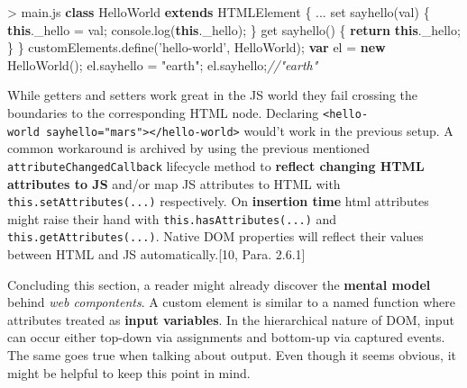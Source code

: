 \documentclass[]{assets/latex/ieee}
\newenvironment{Shaded}{}{}
\newcommand{\KeywordTok}[1]{\textcolor[rgb]{0.00,0.44,0.13}{\textbf{{#1}}}}
\newcommand{\StringTok}[1]{\textcolor[rgb]{0.25,0.44,0.63}{{#1}}}
\newcommand{\CommentTok}[1]{\textcolor[rgb]{0.38,0.63,0.69}{\textit{{#1}}}}
\newcommand{\VariableTok}[1]{\textcolor[rgb]{0.10,0.09,0.49}{{#1}}}
\newcommand{\ControlFlowTok}[1]{\textcolor[rgb]{0.00,0.44,0.13}{\textbf{{#1}}}}
\newcommand{\OperatorTok}[1]{\textcolor[rgb]{0.40,0.40,0.40}{{#1}}}
\newcommand{\AttributeTok}[1]{\textcolor[rgb]{0.49,0.56,0.16}{{#1}}}
\newcommand{\NormalTok}[1]{{#1}}
\begin{document}
\begin{Shaded}
\begin{Highlighting}[]
\OperatorTok{>} \VariableTok{main}\NormalTok{.}\AttributeTok{js}
\KeywordTok{class} \NormalTok{HelloWorld }\KeywordTok{extends} \NormalTok{HTMLElement }\OperatorTok{\{}
  \NormalTok{...}
  \NormalTok{set }\AttributeTok{sayhello}\NormalTok{(val) }\OperatorTok{\{}
    \KeywordTok{this}\NormalTok{.}\AttributeTok{_hello} \OperatorTok{=} \NormalTok{val}\OperatorTok{;}
    \VariableTok{console}\NormalTok{.}\AttributeTok{log}\NormalTok{(}\KeywordTok{this}\NormalTok{.}\AttributeTok{_hello}\NormalTok{)}\OperatorTok{;}
  \OperatorTok{\}}
  \NormalTok{get }\AttributeTok{sayhello}\NormalTok{() }\OperatorTok{\{}
    \ControlFlowTok{return} \KeywordTok{this}\NormalTok{.}\AttributeTok{_hello}\OperatorTok{;}
  \OperatorTok{\}}
\OperatorTok{\}}
\VariableTok{customElements}\NormalTok{.}\AttributeTok{define}\NormalTok{(}\StringTok{'hello-world'}\OperatorTok{,} \NormalTok{HelloWorld)}\OperatorTok{;}
\KeywordTok{var} \NormalTok{el }\OperatorTok{=} \KeywordTok{new} \AttributeTok{HelloWorld}\NormalTok{()}\OperatorTok{;}
\VariableTok{el}\NormalTok{.}\AttributeTok{sayhello} \OperatorTok{=} \StringTok{"earth"}\OperatorTok{;}
\VariableTok{el}\NormalTok{.}\AttributeTok{sayhello}\OperatorTok{;}\CommentTok{//"earth"}
\end{Highlighting}
\end{Shaded}

While getters and setters work great in the JS world they fail crossing
the boundaries to the corresponding HTML node. Declaring
\texttt{\textless{}hello-world\ sayhello="mars"\textgreater{}\textless{}/hello-world\textgreater{}}
would't work in the previous setup. A common workaround is archived by
using the previous mentioned \texttt{attributeChangedCallback} lifecycle
method to \textbf{reflect changing HTML attributes to JS} and/or map JS
attributes to HTML with \texttt{this.setAttributes(...)} respectively.
On \textbf{insertion time} html attributes might raise their hand with
\texttt{this.hasAttributes(...)} and \texttt{this.getAttributes(...)}.
Native DOM properties will reflect their values between HTML and JS
automatically.{[}10, Para. 2.6.1{]}

Concluding this section, a reader might already discover the
\textbf{mental model} behind \emph{web compontents}. A custom element is
similar to a named function where attributes treated as \textbf{input
variables}. In the hierarchical nature of DOM, input can occur either
top-down via assignments and bottom-up via captured events. The same
goes true when talking about output. Even though it seems obvious, it
might be helpful to keep this point in mind.
\end{document}
